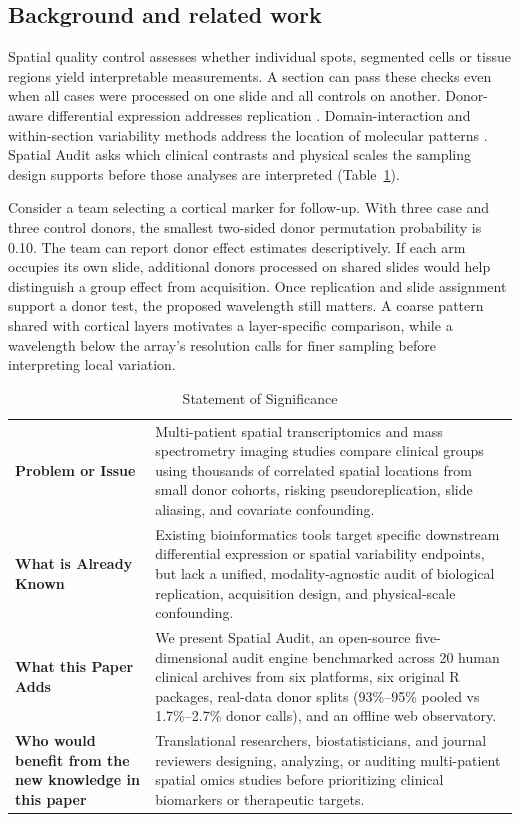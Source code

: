 \documentclass[11pt]{article}
\begin{document}
\subsection{Background and related work}
Spatial quality control assesses whether individual spots, segmented cells or tissue regions yield interpretable measurements. A section can pass these checks even when all cases were processed on one slide and all controls on another. Donor-aware differential expression addresses replication \cite{pseudorep,edger,deseq2}. Domain-interaction and within-section variability methods address the location of molecular patterns \cite{despace2,nnsvg,sparkx,cardinal}. Spatial Audit asks which clinical contrasts and physical scales the sampling design supports before those analyses are interpreted (Table~\ref{tab:significance}).

Consider a team selecting a cortical marker for follow-up. With three case and three control donors, the smallest two-sided donor permutation probability is 0.10. The team can report donor effect estimates descriptively. If each arm occupies its own slide, additional donors processed on shared slides would help distinguish a group effect from acquisition. Once replication and slide assignment support a donor test, the proposed wavelength still matters. A coarse pattern shared with cortical layers motivates a layer-specific comparison, while a wavelength below the array's resolution calls for finer sampling before interpreting local variation.

\begin{table}[htbp]\centering\small
\caption{Statement of Significance}\label{tab:significance}
\begin{tabularx}{\linewidth}{@{}p{.26\linewidth}X@{}}\toprule
\textbf{Problem or Issue} & Multi-patient spatial transcriptomics and mass spectrometry imaging studies compare clinical groups using thousands of correlated spatial locations from small donor cohorts, risking pseudoreplication, slide aliasing, and covariate confounding.\\
\textbf{What is Already Known} & Existing bioinformatics tools target specific downstream differential expression or spatial variability endpoints, but lack a unified, modality-agnostic audit of biological replication, acquisition design, and physical-scale confounding.\\
\textbf{What this Paper Adds} & We present Spatial Audit, an open-source five-dimensional audit engine benchmarked across 20 human clinical archives from six platforms, six original R packages, real-data donor splits (93\%--95\% pooled vs 1.7\%--2.7\% donor calls), and an offline web observatory.\\
\textbf{Who would benefit from the new knowledge in this paper} & Translational researchers, biostatisticians, and journal reviewers designing, analyzing, or auditing multi-patient spatial omics studies before prioritizing clinical biomarkers or therapeutic targets.\\
\bottomrule\end{tabularx}
\end{table}
\end{document}
